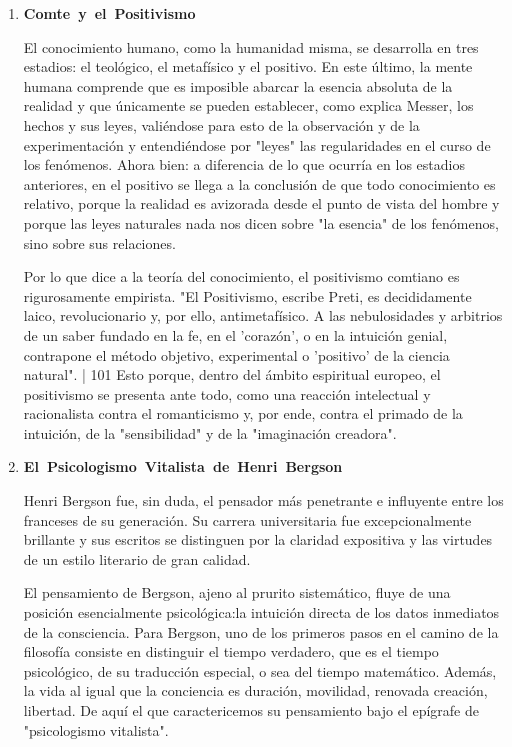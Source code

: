 \begin{enumerate}
\item \textbf{Comte\ y\ el\ Positivismo}

El conocimiento humano, como la humanidad misma, se desarrolla en tres estadios: el teológico, el metafísico y el positivo.
En este último, la mente humana comprende que es imposible abarcar la esencia absoluta de la realidad y que únicamente se pueden establecer,
como explica Messer, los hechos y sus leyes, valiéndose para esto de la observación y de la experimentación y entendiéndose por "leyes" las
regularidades en el curso de los fenómenos.
Ahora bien: a diferencia de lo que ocurría en los estadios anteriores, en el positivo se llega a la conclusión de que todo conocimiento es relativo,
porque la realidad es avizorada desde el punto de vista del hombre y porque las leyes naturales nada nos dicen sobre "la esencia" de los fenómenos,
sino sobre sus relaciones.

Por lo que dice a la teoría del conocimiento, el positivismo comtiano es rigurosamente empirista.
"El Positivismo, escribe Preti, es decididamente laico, revolucionario y, por ello, antimetafísico. A las nebulosidades y arbitrios de un saber fundado en la fe, en el 'corazón', o en la intuición genial, contrapone el método objetivo, experimental o 'positivo' de la ciencia natural". | 101 Esto porque, dentro del ámbito espiritual europeo, el positivismo se presenta ante todo, como una reacción intelectual y racionalista contra el romanticismo y, por ende, contra el primado de la intuición, de la "sensibilidad" y de la "imaginación creadora".

\item \textbf{El\ Psicologismo\ Vitalista\ de\ Henri\ Bergson}

Henri Bergson fue, sin duda, el pensador más penetrante e influyente entre los franceses de su generación. Su carrera universitaria fue excepcionalmente brillante y sus escritos se distinguen por la claridad expositiva y las virtudes de un estilo literario de gran calidad.

El pensamiento de Bergson, ajeno al prurito sistemático, fluye de una posición esencialmente psicológica:la intuición directa de los datos inmediatos de la consciencia.
Para Bergson, uno de los primeros pasos en el camino de la filosofía consiste en distinguir el tiempo verdadero, que es el tiempo psicológico,
de su traducción especial, o sea del tiempo matemático.
Además, la vida al igual que la conciencia es duración, movilidad, renovada creación, libertad.
De aquí el que caractericemos su pensamiento bajo el epígrafe de "psicologismo vitalista".
\end{enumerate}
\newpage

